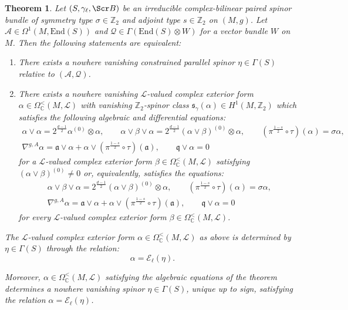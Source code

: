 \documentclass[10pt,a4paper,twoside,reqno]{amsart}
\theoremstyle{plain}
\newtheorem{thm}{Theorem}[section]
\theoremstyle{definition}
\theoremstyle{remark}
\newcommand{\End}{\mathrm{End}}
\def\Z{\mathbb{Z}}
\def\C{\mathbb{C}}
\def\cQ{\mathcal{Q}}
\def\fra{\mathfrak{a}}
\def\frq{\mathfrak{q}}
\def\scB{\Scr B}
\def\cA{\mathcal{A}}
\def\cE{\mathcal{E}}
\def\cL{\mathcal{L}}
\begin{document}
\begin{thm}\label{thm:odd_CB_CPS}
Let $(S,\gamma_\ell,\scB)$ be an irreducible complex-bilinear paired spinor bundle of symmetry type $\sigma\in\Z_2$ and adjoint type $s\in\Z_2$ on $(M,g)$. Let $\cA\in\Omega^1(M,\End(S))$ and $\cQ\in\Gamma(\End(S)\otimes W)$ for a vector bundle $W$ on $M$. Then the following statements are equivalent: 
\begin{enumerate}
        \item[\normalfont(a)] There exists a nowhere vanishing constrained parallel spinor $\eta\in\Gamma(S)$ relative to $(\cA,\cQ)$.
        \item[\normalfont(b)] There exists a nowhere vanishing $\cL$-valued complex exterior form $\alpha\in\Omega^<_\C(M,\cL)$ with vanishing $\mathbb{Z}_2$-spinor class $\mathfrak{s}_{\gamma}(\alpha)\in H^1(M,\Z_2)$ which satisfies the following algebraic and differential equations: \begin{gather*}
            \alpha\vee\alpha=2^{\frac{d-1}{2}}\alpha^{(0)}\otimes\alpha,\qquad \alpha\vee\beta\vee\alpha=2^{\frac{d-1}{2}}(\alpha\vee\beta)^{(0)}\otimes\alpha,\qquad (\pi^{\frac{1-s}{2}}\circ\tau)(\alpha)=\sigma\alpha,\\
            \nabla^{g,A}\alpha=\fra\vee\alpha+\alpha\vee(\pi^{\frac{1-s}{2}}\circ\tau)(\fra),\qquad \frq\vee\alpha=0
        \end{gather*} for a $\cL$-valued complex exterior form $\beta\in\Omega^<_\C(M,\cL)$ satisfying $(\alpha\vee\beta)^{(0)}\neq0$ or, equivalently, satisfies the equations: \begin{gather*}
            \alpha\vee\beta\vee\alpha=2^{\frac{d-1}{2}}(\alpha\vee\beta)^{(0)}\otimes\alpha,\qquad (\pi^{\frac{1-s}{2}}\circ\tau)(\alpha)=\sigma\alpha,\\
            \nabla^{g,A}\alpha=\fra\vee\alpha+\alpha\vee(\pi^{\frac{1-s}{2}}\circ\tau)(\fra),\qquad \frq\vee\alpha=0
        \end{gather*} for every $\cL$-valued complex exterior form $\beta\in\Omega^<_\C(M,\cL)$.
    \end{enumerate}
    
    The $\cL$-valued complex exterior form $\alpha\in\Omega^<_\C(M,\cL)$ as above is determined by $\eta\in\Gamma(S)$ through the relation: $$\alpha=\cE_\ell(\eta).$$
    
    Moreover, $\alpha\in\Omega^<_\C(M,\cL)$ satisfying the algebraic equations of the theorem determines a nowhere vanishing spinor $\eta\in\Gamma(S)$, unique up to sign, satisfying the relation $\alpha=\cE_\ell(\eta)$.
\end{thm}
 
\end{document}
